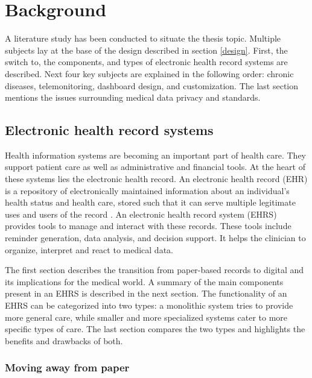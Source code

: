 \section{Background} \label{background}

A literature study has been conducted to situate the thesis topic. Multiple subjects lay at the base of the design described in section \ref{design}. First, the switch to, the components, and types of electronic health record systems are described. Next four key subjects are explained in the following order: chronic diseases, telemonitoring, dashboard design, and customization. The last section mentions the issues surrounding medical data privacy and standards. 

    \subsection{Electronic health record systems}

    Health information systems are becoming an important part of health care. They support patient care as well as administrative and financial tools. At the heart of these systems lies the electronic health record. An electronic health record (EHR) is a repository of electronically maintained information about an individual's health status and health care, stored such that it can serve multiple legitimate uses and users of the record \cite{biomedical_informatics}. An electronic health record system (EHRS) provides tools to manage and interact with these records. These tools include reminder generation, data analysis, and decision support. It helps the clinician to organize, interpret and react to medical data.

    The first section describes the transition from paper-based records to digital and its implications for the medical world. A summary of the main components present in an EHRS is described in the next section. The functionality of an EHRS can be categorized into two types: a monolithic system tries to provide more general care, while smaller and more specialized systems cater to more specific types of care. The last section compares the two types and highlights the benefits and drawbacks of both.

        \subsubsection{Moving away from paper} \label{2_ehrs_paper}

